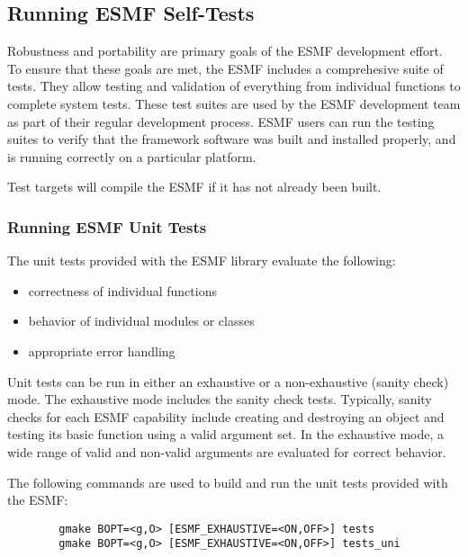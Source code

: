 
\subsection{Running ESMF Self-Tests}
\label{testing}

Robustness and portability are primary goals of the ESMF development effort. 
To ensure that these goals are met, the ESMF includes a comprehesive suite of tests. 
They allow testing and validation of everything from individual functions to complete 
system tests.  These test suites are used by the ESMF development team as part of their 
regular development process.  ESMF users can run the testing suites to verify that 
the framework software was built and installed properly, and is running correctly on
a particular platform. 

Test targets will compile the ESMF if it has not already been built.

\subsubsection{Running ESMF Unit Tests}

\label{UnitTestDescription}
The unit tests provided with the ESMF library evaluate the following:
\begin{itemize}
\item correctness of individual functions
\item behavior of individual modules or classes
\item appropriate error handling
\end{itemize}

Unit tests can be run in either an exhaustive or a non-exhaustive (sanity check)
mode.  The exhaustive mode includes the sanity check tests.  Typically, sanity
checks for each ESMF capability include creating and destroying an object and 
testing its basic function using a valid argument set.  In the exhaustive mode,
a wide range of valid and non-valid arguments are evaluated for correct behavior.

\label{RunUnitTests}

The following commands are used to build and run the unit tests provided with 
the ESMF:
\begin{verbatim}
        gmake BOPT=<g,O> [ESMF_EXHAUSTIVE=<ON,OFF>] tests
        gmake BOPT=<g,O> [ESMF_EXHAUSTIVE=<ON,OFF>] tests_uni
\end{verbatim}

